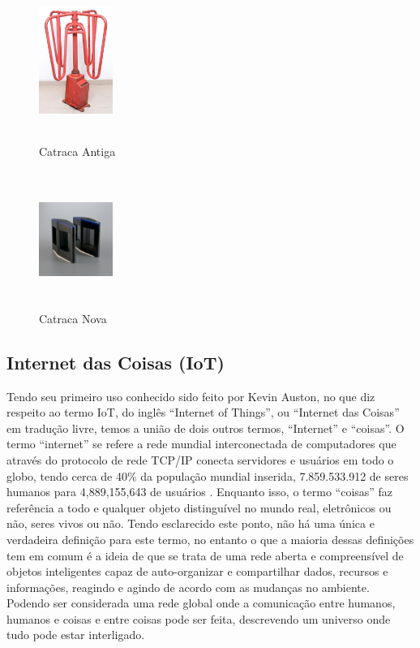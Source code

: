 \begin{figure}[H]
	\centering
	\begin{minipage}{.5\textwidth}
	  \centering
	  \includegraphics[width=0.95in,height=1.75in]{./media/catraca_antiga.jpg}
	  \caption{Catraca Antiga}
	  \label{fig:older}
	\end{minipage}%
	\begin{minipage}{.5\textwidth}
		\centering
		\includegraphics[width=0.95in,height=1.75in]{./media/catraca_nova.jpg}
		\caption{Catraca Nova}
		\label{fig:new}
	\end{minipage}
	  \end{figure}


\subsection{Internet das Coisas (IoT)}
Tendo seu primeiro uso conhecido sido feito por Kevin Auston, no que diz respeito ao termo IoT, do inglês “Internet of Things”, ou “Internet das Coisas” em tradução livre, temos a união de dois outros termos, “Internet” e “coisas”. O termo “internet” se refere a rede mundial interconectada de computadores que através do protocolo de rede TCP/IP conecta servidores e usuários em todo o globo, tendo cerca de 40\% da população mundial inserida, 7.859.533.912 de seres humanos \cite{populacao} para 4,889,155,643 de usuários \cite{usuarios}. Enquanto isso, o termo “coisas” faz referência a todo e qualquer objeto distinguível no mundo real, eletrônicos ou não, seres vivos ou não. Tendo esclarecido este ponto, não há uma única e verdadeira definição para este termo, no entanto o que a maioria dessas definições tem em comum é a ideia de que se trata de uma rede aberta e compreensível de objetos inteligentes capaz de auto-organizar e compartilhar dados, recursos e informações, reagindo e agindo de acordo com as mudanças no ambiente. Podendo ser considerada uma rede global onde a comunicação entre humanos, humanos e coisas e entre coisas pode ser feita, descrevendo um universo onde tudo pode estar interligado. \cite{iot}

